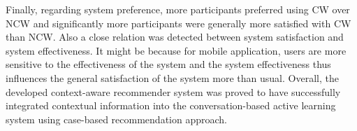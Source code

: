 Finally, regarding system preference, more participants preferred using CW over NCW and significantly more participants were generally more satisfied with CW than NCW. Also a close relation was detected between system satisfaction and system effectiveness. It might be because for mobile application, users are more sensitive to the effectiveness of the system and the system effectiveness thus influences the general satisfaction of the system more than usual. Overall, the developed context-aware recommender system was proved to have successfully integrated contextual information into the conversation-based active learning system using case-based recommendation approach. 

















































